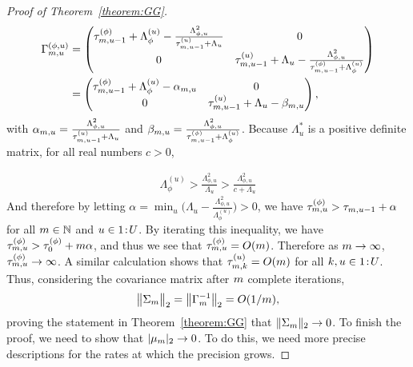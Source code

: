 \begin{proof}[Proof of Theorem~\ref{theorem:GG}]
\begin{align}
\begin{split}
 \Gamma^{(\phi, u)}_{m, u} &= \begin{pmatrix}
    \tau_{m, u-1}^{(\phi)} + \Lambda_{\phi}^{(u)} - \frac{\Lambda_{\phi, u}^2}{\tau_{m, u-1}^{(u)} + \Lambda_u} & 0 \\
    0 & \tau_{m, u-1}^{(u)} + \Lambda_u - \frac{\Lambda_{\phi, u}^2}{\tau_{m, u-1}^{(\phi)} + \Lambda^{(u)}_{\phi}}
   \end{pmatrix} \\
   &= \begin{pmatrix}
    \tau_{m, u-1}^{(\phi)} + \Lambda_{\phi}^{(u)} - \alpha_{m, u} & 0 \\
    0 & \tau_{m, u-1}^{(u)} + \Lambda_u - \beta_{m, u}
   \end{pmatrix},
   \end{split}\label{eq:margPrecision}
\end{align}
with $\alpha_{m, u} = \frac{\Lambda_{\phi, u}^2}{\tau_{m, u-1}^{(u)} + \Lambda_u}$ and $\beta_{m, u} = \frac{\Lambda_{\phi, u}^2}{\tau_{m, u-1}^{(\phi)} + \Lambda^{(u)}_{\phi}}$. Because $\Lambda^*_u$ is a positive definite matrix, for all real numbers $c > 0$, 

\begin{align*}
    \Lambda_{\phi}^{(u)} > \frac{\Lambda^2_{\phi, u}}{\Lambda_{u}} > \frac{\Lambda^2_{\phi, u}}{c + \Lambda_{u}} 
  \end{align*}
And therefore by letting $\alpha = \min_u \big(\Lambda_u - \frac{\Lambda^2_{\phi, u}}{\Lambda^{(u)}_{\phi}}\big) > 0$, we have $\tau_{m, u}^{(\phi)} > \tau_{m, u-1} + \alpha$ for all $m \in \mathbb{N}$ and $u \in {1}\!:\!{U}$. 
By iterating this inequality, we have $\tau_{m, u}^{(\phi)} > \tau^{(\phi)}_0 + m\alpha$, and thus we see that $\tau_{m, u}^{(\phi)} = O(m)$. 
Therefore as $m \rightarrow \infty$, $\tau_{m, u}^{(\phi)} \rightarrow \infty$. 
A similar calculation shows that $\tau_{m, k}^{(u)} = O(m)$ for all $k, u \in {1}\!:\!{U}$. 
Thus, considering the covariance matrix after $m$ complete iterations, 
$$
\big\|\Sigma_{m}\big\|_2 = \big\|\Gamma^{-1}_m\big\|_2 = O(1/m),
$$
proving the statement in Theorem~\ref{theorem:GG} that $\|\Sigma_m\|_2 \rightarrow 0$. 
To finish the proof, we need to show that $|\mu_m|_2 \rightarrow 0$. 
To do this, we need more precise descriptions for the rates at which the precision grows. 


\end{proof}
